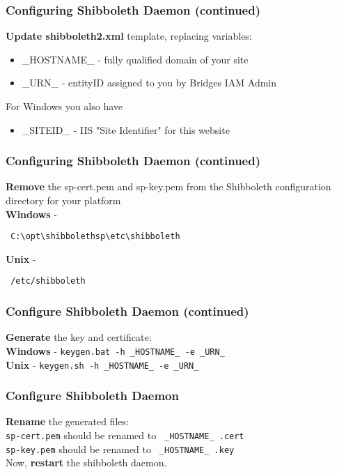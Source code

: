 \documentclass[hyperref={colorlinks=true},professionalfonts]{beamer}
\newcommand{\us}[1]{ \_#1\_ } %
\begin{document}
\begin{frame}
\frametitle{Configuring Shibboleth Daemon (continued)}
\textbf{Update shibboleth2.xml} template, replacing variables: \\
\begin{itemize}
\item \us{HOSTNAME} - fully qualified domain of your site 
\item \us{URN} - entityID assigned to you by Bridges IAM Admin
\end{itemize}
For Windows you also have
\begin{itemize}
\item \us{SITEID} - IIS "Site Identifier" for this website
\end{itemize}
\end{frame}

\begin{frame}[fragile]
\frametitle{Configuring Shibboleth Daemon (continued)}
\textbf{Remove} the sp-cert.pem and sp-key.pem from the Shibboleth configuration directory for your platform \\ \bigskip
\textbf{Windows} - \begin{verbatim} C:\opt\shibbolethsp\etc\shibboleth \end{verbatim}
\textbf{Unix} - \begin{verbatim} /etc/shibboleth \end{verbatim}
\end{frame}

\begin{frame}[fragile]
\frametitle{Configure Shibboleth Daemon (continued)}
\textbf{Generate} the key and certificate: \\ \bigskip
\textbf{Windows} - \texttt{keygen.bat -h \us{HOSTNAME} -e \us{URN}} \\
\bigskip
\textbf{Unix} - \texttt{keygen.sh -h \us{HOSTNAME} -e \us{URN}} \\
\end{frame}

\begin{frame}
\frametitle{Configure Shibboleth Daemon}
\textbf{Rename} the generated files: \\ \bigskip
\texttt{sp-cert.pem} should be renamed to \texttt{\us{HOSTNAME}.cert} \\
\bigskip
\texttt{sp-key.pem} should be renamed to \texttt{\us{HOSTNAME}.key} \\
\bigskip
Now, \textbf{restart} the shibboleth daemon.
\end{frame}
\end{document}
